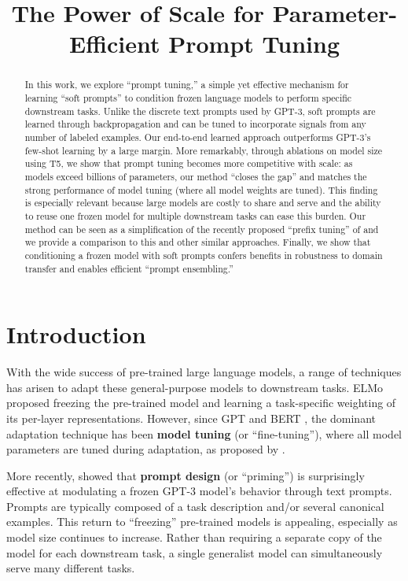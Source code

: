 \title{The Power of Scale for Parameter-Efficient Prompt Tuning}

\begin{abstract}
In this work, we explore ``prompt tuning,'' a simple yet effective mechanism for learning ``soft prompts'' to condition frozen language models to perform specific downstream tasks. Unlike the discrete text prompts used by \mbox{GPT-3}, soft prompts are learned through backpropagation and can be tuned to incorporate signals from any number of labeled examples. Our end-to-end learned approach outperforms \mbox{GPT-3's} few-shot learning by a large margin. More remarkably, through ablations on model size using T5, we show that prompt tuning becomes more competitive with scale: as models exceed billions of parameters, our method ``closes the gap'' and matches the strong performance of model tuning (where all model weights are tuned). This finding is especially relevant because large models are costly to share and serve and the ability to reuse one frozen model for multiple downstream tasks can ease this burden. Our method can be seen as a simplification of the recently proposed ``prefix tuning'' of \citet{li_2021_prefix_tuning} and we provide a comparison to this and other similar approaches. Finally, we show that conditioning a frozen model with soft prompts confers benefits in robustness to domain transfer and enables efficient ``prompt ensembling.''
\end{abstract}

\section{Introduction}

With the wide success of pre-trained large language models, a range of techniques has arisen to adapt these general-purpose models to downstream tasks. ELMo \cite{peters-etal-2018-deep} proposed freezing the pre-trained model and learning a task-specific weighting of its per-layer representations. However, since GPT \cite{gpt} and BERT \cite{devlin-etal-2019-bert}, the dominant adaptation technique has been \textbf{model tuning} (or ``fine-tuning''), where all model parameters are tuned during adaptation, as proposed by \citet{howard-ruder-2018-universal}.

More recently, \citet{brown_2020_gpt3} showed that \textbf{prompt design} (or ``priming'') is surprisingly effective at modulating a frozen \mbox{GPT-3} model's behavior through text prompts. Prompts are typically composed of a task description and/or several canonical examples. This return to ``freezing'' pre-trained models is appealing, especially as model size continues to increase. Rather than requiring a separate copy of the model for each downstream task, a single generalist model can simultaneously serve many different tasks.

